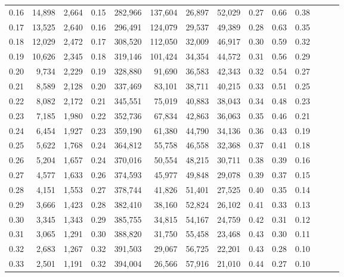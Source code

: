 \begin{tabular}{rrrrrrrrrrrrrr}
0.16 &  14,898 &  2,664 &  0.15 &  282,966 &  137,604 &  26,897 &  52,029 &  0.27 &  0.66 &      0.38 \\
0.17 &  13,525 &  2,640 &  0.16 &  296,491 &  124,079 &  29,537 &  49,389 &  0.28 &  0.63 &      0.35 \\
0.18 &  12,029 &  2,472 &  0.17 &  308,520 &  112,050 &  32,009 &  46,917 &  0.30 &  0.59 &      0.32 \\
0.19 &  10,626 &  2,345 &  0.18 &  319,146 &  101,424 &  34,354 &  44,572 &  0.31 &  0.56 &      0.29 \\
0.20 &   9,734 &  2,229 &  0.19 &  328,880 &   91,690 &  36,583 &  42,343 &  0.32 &  0.54 &      0.27 \\
0.21 &   8,589 &  2,128 &  0.20 &  337,469 &   83,101 &  38,711 &  40,215 &  0.33 &  0.51 &      0.25 \\
0.22 &   8,082 &  2,172 &  0.21 &  345,551 &   75,019 &  40,883 &  38,043 &  0.34 &  0.48 &      0.23 \\
0.23 &   7,185 &  1,980 &  0.22 &  352,736 &   67,834 &  42,863 &  36,063 &  0.35 &  0.46 &      0.21 \\
0.24 &   6,454 &  1,927 &  0.23 &  359,190 &   61,380 &  44,790 &  34,136 &  0.36 &  0.43 &      0.19 \\
0.25 &   5,622 &  1,768 &  0.24 &  364,812 &   55,758 &  46,558 &  32,368 &  0.37 &  0.41 &      0.18 \\
0.26 &   5,204 &  1,657 &  0.24 &  370,016 &   50,554 &  48,215 &  30,711 &  0.38 &  0.39 &      0.16 \\
0.27 &   4,577 &  1,633 &  0.26 &  374,593 &   45,977 &  49,848 &  29,078 &  0.39 &  0.37 &      0.15 \\
0.28 &   4,151 &  1,553 &  0.27 &  378,744 &   41,826 &  51,401 &  27,525 &  0.40 &  0.35 &      0.14 \\
0.29 &   3,666 &  1,423 &  0.28 &  382,410 &   38,160 &  52,824 &  26,102 &  0.41 &  0.33 &      0.13 \\
0.30 &   3,345 &  1,343 &  0.29 &  385,755 &   34,815 &  54,167 &  24,759 &  0.42 &  0.31 &      0.12 \\
0.31 &   3,065 &  1,291 &  0.30 &  388,820 &   31,750 &  55,458 &  23,468 &  0.43 &  0.30 &      0.11 \\
0.32 &   2,683 &  1,267 &  0.32 &  391,503 &   29,067 &  56,725 &  22,201 &  0.43 &  0.28 &      0.10 \\
0.33 &   2,501 &  1,191 &  0.32 &  394,004 &   26,566 &  57,916 &  21,010 &  0.44 &  0.27 &      0.10 \\

\end{tabular}
